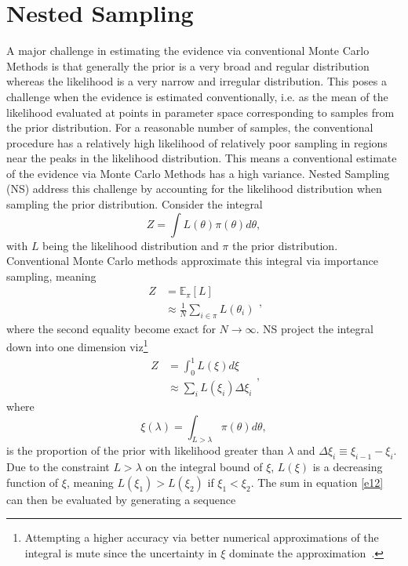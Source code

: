 \chapter{Nested Sampling}
\label{app:NS}
A major challenge in estimating the evidence via conventional Monte Carlo Methods is that generally the prior is a very broad and regular distribution whereas the likelihood is a very narrow and irregular distribution. This poses a challenge when the evidence is estimated conventionally, i.e. as the mean of the likelihood evaluated at points in parameter space corresponding to samples from the prior distribution. For a reasonable number of samples, the conventional procedure has a relatively high likelihood of relatively poor sampling in regions near the peaks in the likelihood distribution. This means a conventional estimate of the evidence via Monte Carlo Methods has a high variance. Nested Sampling~\citep{skilling2004} (NS) address this challenge by accounting for the likelihood distribution when sampling the prior distribution. Consider the integral
\begin{equation}
	Z  = \int L(\theta)\pi(\theta)d\theta,
\end{equation}
with $L$ being the likelihood distribution and $\pi$ the prior distribution. Conventional Monte Carlo methods approximate this integral via importance sampling, meaning
\begin{equation}
	\begin{split}
		Z &= \mathbb{E}_\pi[L]\\
		&\approx \frac{1}{N}\sum_{i\in \pi}L(\theta_i)
	\end{split},
	\label{eq:importance}
\end{equation}
where the second equality become exact for $N\rightarrow \infty$. NS project the integral down into one dimension viz\footnote{Attempting a higher accuracy via better numerical approximations of the integral is mute since the uncertainty in $\xi$ dominate the approximation~\citep{skilling2004}.}
\begin{equation}
	\begin{split}
		Z &= \int_0^1 L(\xi) d\xi\\
		&\approx \sum_{i}L(\xi_i)\Delta \xi_i
	\end{split},
	\label{e12}
\end{equation}
where
\begin{equation}
	\xi(\lambda) = \int_{L>\lambda} \pi(\theta)d\theta,
\end{equation}
is the proportion of the prior with likelihood greater than $\lambda$ and $\Delta \xi_i\equiv \xi_{i-1}-\xi_i$. Due to the constraint $L>\lambda$ on the integral bound of $\xi$, $L(\xi)$ is a decreasing function of $\xi$, meaning $L(\xi_1)>L(\xi_2)$ if $\xi_1<\xi_2$. The sum in equation \eqref{e12} can then be evaluated by generating a sequence
